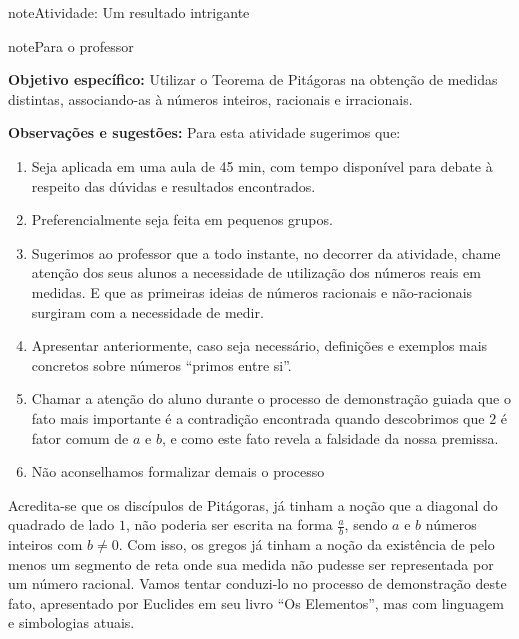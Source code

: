 \begin{sphinxadmonition}{note}{Atividade: Um resultado intrigante}

\begin{sphinxadmonition}{note}{Para o professor}

\textbf{Objetivo específico:} Utilizar o Teorema de Pitágoras na obtenção de medidas distintas, associando-as à números inteiros, racionais e irracionais.

\textbf{Observações e sugestões:}
Para esta atividade sugerimos que:
\begin{enumerate}
\item {} 
Seja aplicada em uma aula de 45 min, com tempo disponível para debate à respeito das dúvidas e resultados encontrados.

\item {} 
Preferencialmente seja feita em pequenos grupos.

\item {} 
Sugerimos ao professor que a todo instante, no decorrer da atividade, chame atenção dos seus alunos a necessidade de utilização dos números reais em medidas. E que as primeiras ideias de números racionais e não-racionais surgiram com a necessidade de medir.

\item {} 
Apresentar anteriormente, caso seja necessário, definições e exemplos mais concretos sobre números “primos entre si”.

\item {} 
Chamar a atenção do aluno durante o processo de demonstração guiada que o fato mais importante é a contradição encontrada quando descobrimos que \(2\) é fator comum de \(a\) e \(b\), e como este fato revela a falsidade da nossa premissa.

\item {} 
Não aconselhamos formalizar demais o processo

\end{enumerate}
\end{sphinxadmonition}

Acredita-se que os discípulos de Pitágoras, já tinham a noção que a diagonal do quadrado de lado \(1\), não poderia ser escrita na forma \(\frac{a}{b}\), sendo \(a\) e \(b\) números inteiros com \(b \neq 0\). Com isso, os gregos já tinham a noção da existência de pelo menos um segmento de reta onde sua medida não pudesse ser representada por um número racional. Vamos tentar conduzi-lo no processo de demonstração deste fato, apresentado por Euclides em seu livro  “Os Elementos”, mas com linguagem e simbologias atuais.


\end{sphinxadmonition}
